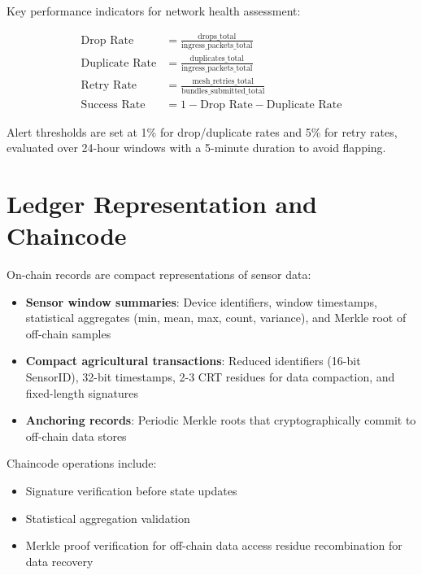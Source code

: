 \documentclass[12pt]{article}
\begin{document}
Key performance indicators for network health assessment:

\begin{align*}
\text{Drop Rate} &= \frac{\text{drops\_total}}{\text{ingress\_packets\_total}} \\
\text{Duplicate Rate} &= \frac{\text{duplicates\_total}}{\text{ingress\_packets\_total}} \\
\text{Retry Rate} &= \frac{\text{mesh\_retries\_total}}{\text{bundles\_submitted\_total}} \\
\text{Success Rate} &= 1 - \text{Drop Rate} - \text{Duplicate Rate}
\end{align*}

Alert thresholds are set at 1\% for drop/duplicate rates and 5\% for retry rates, evaluated over 24-hour windows with a 5-minute duration to avoid flapping.

\section{Ledger Representation and Chaincode}
\label{sec:chaincode}

On-chain records are compact representations of sensor data:

\begin{itemize}
    \item \textbf{Sensor window summaries}: Device identifiers, window timestamps, statistical aggregates (min, mean, max, count, variance), and \gls{Merkle root} of off-chain samples
    \item \textbf{Compact agricultural transactions}: Reduced identifiers (16-bit SensorID), 32-bit timestamps, 2-3 \gls{CRT} residues for data compaction, and fixed-length signatures
    \item \textbf{Anchoring records}: Periodic Merkle roots that cryptographically commit to off-chain data stores
\end{itemize}

Chaincode operations include:
\begin{itemize}
    \item Signature verification before state updates
    \item Statistical aggregation validation
    \item Merkle proof verification for off-chain data access
     residue recombination for data recovery
\end{itemize}

\end{document}
